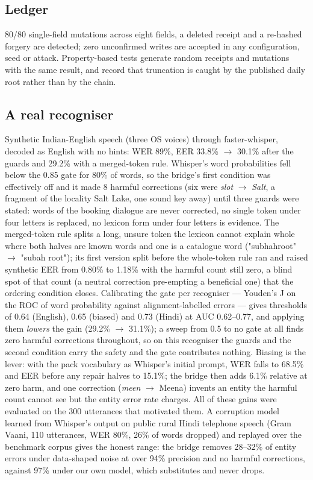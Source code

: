 \documentclass[conference]{IEEEtran}
\begin{document}
\subsection{Ledger}

80/80 single-field mutations across eight fields, a deleted receipt and a re-hashed forgery are detected; zero unconfirmed writes are accepted in any configuration, seed or attack. Property-based tests generate random receipts and mutations with the same result, and record that truncation is caught by the published daily root rather than by the chain.

\subsection{A real recogniser}

Synthetic Indian-English speech (three OS voices) through faster-whisper, decoded as English with no hints: WER 89\%, EER 33.8\% $\rightarrow$ 30.1\% after the guards and 29.2\% with a merged-token rule. Whisper's word probabilities fell below the 0.85 gate for 80\% of words, so the bridge's first condition was effectively off and it made 8 harmful corrections (six were \emph{slot} $\rightarrow$ \emph{Salt}, a fragment of the locality Salt Lake, one sound key away) until three guards were stated: words of the booking dialogue are never corrected, no single token under four letters is replaced, no lexicon form under four letters is evidence. The merged-token rule splits a long, unsure token the lexicon cannot explain whole where both halves are known words and one is a catalogue word ("subhahroot" $\rightarrow$ "subah root"); its first version split before the whole-token rule ran and raised synthetic EER from 0.80\% to 1.18\% with the harmful count still zero, a blind spot of that count (a neutral correction pre-empting a beneficial one) that the ordering condition closes. Calibrating the gate per recogniser --- Youden's J on the ROC of word probability against alignment-labelled errors --- gives thresholds of 0.64 (English), 0.65 (biased) and 0.73 (Hindi) at AUC 0.62--0.77, and applying them \emph{lowers} the gain (29.2\% $\rightarrow$ 31.1\%); a sweep from 0.5 to no gate at all finds zero harmful corrections throughout, so on this recogniser the guards and the second condition carry the safety and the gate contributes nothing. Biasing is the lever: with the pack vocabulary as Whisper's initial prompt, WER falls to 68.5\% and EER before any repair halves to 15.1\%; the bridge then adds 6.1\% relative at zero harm, and one correction (\emph{meen} $\rightarrow$ Meena) invents an entity the harmful count cannot see but the entity error rate charges. All of these gains were evaluated on the 300 utterances that motivated them. A corruption model learned from Whisper's output on public rural Hindi telephone speech (Gram Vaani, 110 utterances, WER 80\%, 26\% of words dropped) and replayed over the benchmark corpus gives the honest range: the bridge removes 28--32\% of entity errors under data-shaped noise at over 94\% precision and no harmful corrections, against 97\% under our own model, which substitutes and never drops.
\end{document}
